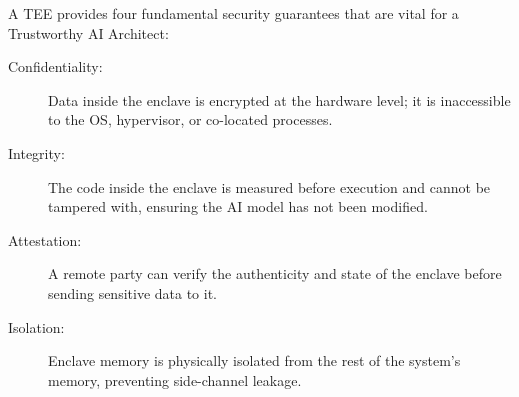 A TEE provides four fundamental security guarantees that are vital for a Trustworthy AI Architect:

\begin{description}
  \item[Confidentiality:] 
        Data inside the enclave is encrypted at the hardware level; it is inaccessible to the OS, hypervisor, or co-located processes.
  \item[Integrity:]
        The code inside the enclave is measured before execution and cannot be tampered with, ensuring the AI model has not been modified.
  \item[Attestation:]
        A remote party can verify the authenticity and state of the enclave before sending sensitive data to it.
  \item[Isolation:]
        Enclave memory is physically isolated from the rest of the system's memory, preventing side-channel leakage.
\end{description}

